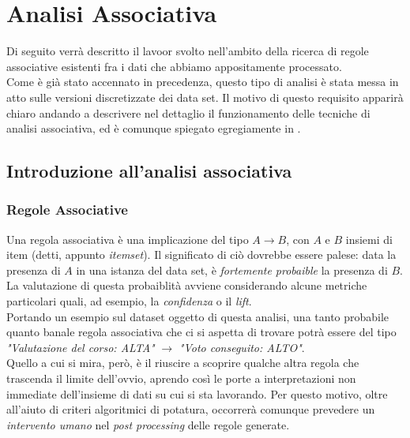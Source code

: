 \chapter{Analisi Associativa}

Di seguito verrà descritto il lavoor svolto nell'ambito della ricerca di regole associative esistenti fra i dati che abbiamo appositamente processato. \\

Come è già stato accennato in precedenza, questo tipo di analisi è stata messa in atto sulle versioni discretizzate dei data set. Il motivo di questo requisito apparirà chiaro andando a descrivere nel dettaglio il funzionamento delle tecniche di analisi associativa, ed è comunque spiegato egregiamente in \cite{dispense}. 

\section{Introduzione all'analisi associativa}

    \subsection{Regole Associative}

        Una regola associativa è una implicazione del tipo $A \rightarrow B$, con $A$ e $B$ insiemi di item (detti, appunto \textit{itemset}). Il significato di ciò dovrebbe essere palese: data la presenza di $A$ in una istanza del data set, è \textit{fortemente probaible} la presenza di $B$. La valutazione di questa probaiblità avviene considerando alcune metriche particolari quali, ad esempio, la \textit{confidenza} o il \textit{lift}. \\

        Portando un esempio sul dataset oggetto di questa analisi, una tanto probabile quanto banale regola associativa che ci si aspetta di trovare potrà essere del tipo \textit{"Valutazione del corso: ALTA"} $\rightarrow$ \textit{"Voto conseguito: ALTO"}. \\
        
        Quello a cui si mira, però, è il riuscire a scoprire qualche altra regola che trascenda il limite dell'ovvio, aprendo così le porte a interpretazioni non immediate dell'insieme di dati su cui si sta lavorando. Per questo motivo, oltre all'aiuto di criteri algoritmici di potatura, occorrerà comunque prevedere un \textit{intervento umano} nel \textit{post processing} delle regole generate.

